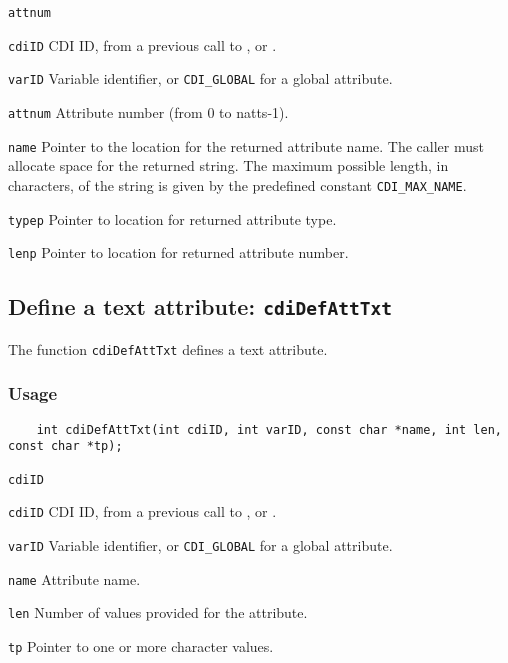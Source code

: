 \hspace*{4mm}\begin{minipage}[]{15cm}
\begin{deflist}{\texttt{attnum}\ }
\item[\texttt{cdiID}]
CDI ID, from a previous call to {}, {} or {}.
\item[\texttt{varID}]
Variable identifier, or {\texttt{CDI\_GLOBAL}} for a global attribute.
\item[\texttt{attnum}]
Attribute number (from 0 to natts-1).
\item[\texttt{name}]
Pointer to the location for the returned attribute name. The caller must allocate space for the
                    returned string. The maximum possible length, in characters, of
                    the string is given by the predefined constant {\texttt{CDI\_MAX\_NAME}}.
\item[\texttt{typep}]
Pointer to location for returned attribute type.
\item[\texttt{lenp}]
Pointer to location for returned attribute number.

\end{deflist}
\end{minipage}


\subsection{Define a text attribute: \texttt{cdiDefAttTxt}}
\label{cdiDefAttTxt}

The function {\texttt{cdiDefAttTxt}} defines a text attribute.

\subsubsection*{Usage}

\begin{verbatim}
    int cdiDefAttTxt(int cdiID, int varID, const char *name, int len, const char *tp);
\end{verbatim}

\hspace*{4mm}\begin{minipage}[]{15cm}
\begin{deflist}{\texttt{cdiID}\ }
\item[\texttt{cdiID}]
CDI ID, from a previous call to {}, {} or {}.
\item[\texttt{varID}]
Variable identifier, or {\texttt{CDI\_GLOBAL}} for a global attribute.
\item[\texttt{name}]
Attribute name.
\item[\texttt{len}]
Number of values provided for the attribute.
\item[\texttt{tp}]
Pointer to one or more character values.

\end{deflist}
\end{minipage}

